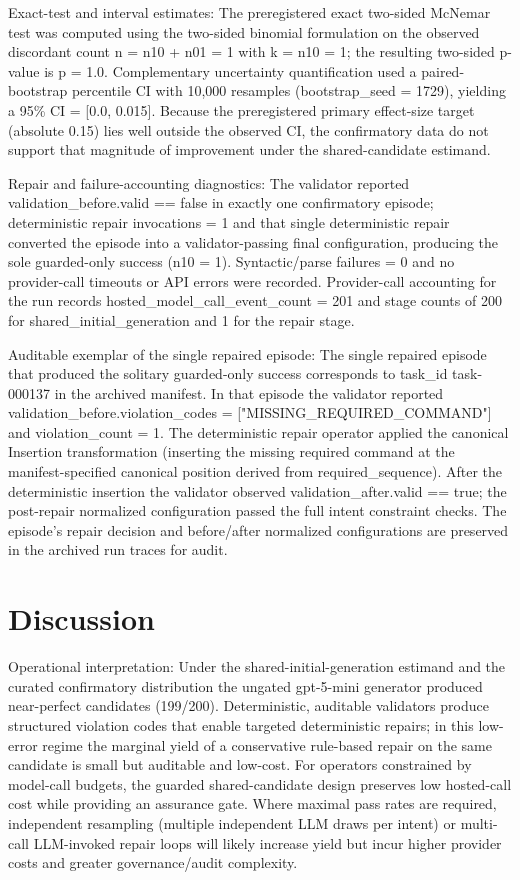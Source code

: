 \documentclass[conference]{IEEEtran}
\begin{document}
Exact-test and interval estimates: The preregistered exact two-sided McNemar test was computed using the two-sided binomial formulation on the observed discordant count n = n10 + n01 = 1 with k = n10 = 1; the resulting two-sided p-value is p = 1.0. Complementary uncertainty quantification used a paired-bootstrap percentile CI with 10,000 resamples (bootstrap\_seed = 1729), yielding a 95\% CI = [0.0, 0.015]. Because the preregistered primary effect-size target (absolute 0.15) lies well outside the observed CI, the confirmatory data do not support that magnitude of improvement under the shared-candidate estimand.

Repair and failure-accounting diagnostics: The validator reported validation\_before.valid == false in exactly one confirmatory episode; deterministic repair invocations = 1 and that single deterministic repair converted the episode into a validator-passing final configuration, producing the sole guarded-only success (n10 = 1). Syntactic/parse failures = 0 and no provider-call timeouts or API errors were recorded. Provider-call accounting for the run records hosted\_model\_call\_event\_count = 201 and stage counts of 200 for shared\_initial\_generation and 1 for the repair stage.

Auditable exemplar of the single repaired episode: The single repaired episode that produced the solitary guarded-only success corresponds to task\_id task-000137 in the archived manifest. In that episode the validator reported validation\_before.violation\_codes = ["MISSING\_REQUIRED\_COMMAND"] and violation\_count = 1. The deterministic repair operator applied the canonical Insertion transformation (inserting the missing required command at the manifest-specified canonical position derived from required\_sequence). After the deterministic insertion the validator observed validation\_after.valid == true; the post-repair normalized configuration passed the full intent constraint checks. The episode's repair decision and before/after normalized configurations are preserved in the archived run traces for audit.

\section{Discussion}
Operational interpretation: Under the shared-initial-generation estimand and the curated confirmatory distribution the ungated gpt-5-mini generator produced near-perfect candidates (199/200). Deterministic, auditable validators produce structured violation codes that enable targeted deterministic repairs; in this low-error regime the marginal yield of a conservative rule-based repair on the same candidate is small but auditable and low-cost. For operators constrained by model-call budgets, the guarded shared-candidate design preserves low hosted-call cost while providing an assurance gate. Where maximal pass rates are required, independent resampling (multiple independent LLM draws per intent) or multi-call LLM-invoked repair loops will likely increase yield but incur higher provider costs and greater governance/audit complexity.
\end{document}
